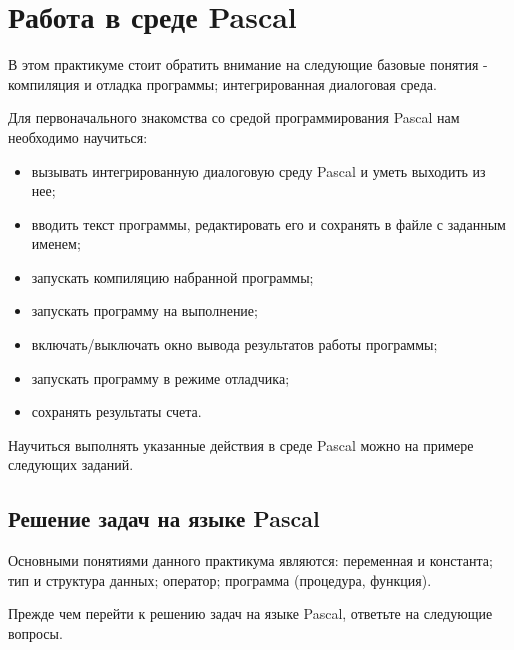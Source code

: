\newpage

\section{Работа в среде  Pascal}

В этом практикуме стоит обратить внимание на следующие базовые понятия - компиляция и отладка программы; интегрированная диалоговая среда.

Для первоначального знакомства со средой программирования Pascal нам необходимо научиться:
\begin{itemize}
	\item вызывать интегрированную диалоговую среду Pascal и уметь выходить из нее;
	\item вводить текст программы, редактировать его и сохранять в файле с заданным именем;
	\item запускать компиляцию набранной программы;
	\item запускать программу на выполнение;
	\item включать/выключать окно вывода результатов работы программы;
	\item запускать программу в режиме отладчика;
	\item сохранять результаты счета.
\end{itemize}

Научиться выполнять указанные действия в среде Pascal можно на примере следующих заданий.

\subsection{Решение задач на языке Pascal}

Основными понятиями данного практикума являются: переменная и константа; тип и структура данных; оператор; программа (процедура, функция).

Прежде чем перейти к решению задач на языке Pascal, ответьте на следующие вопросы.

